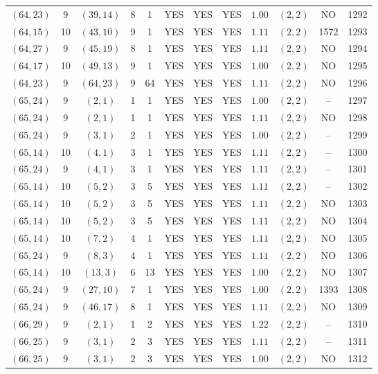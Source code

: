 \begin{longtable}{|c|c|c|c|c|c|c|c|c|c|c|c|}
$(64,23)$ & 9 & $(39,14)$ & 8 & 1 & YES & YES & YES & $1.00$ & $(2,2)$ & NO & 1292\\
$(64,15)$ & 10 & $(43,10)$ & 9 & 1 & YES & YES & YES & $1.11$ & $(2,2)$ & 1572 & 1293\\
$(64,27)$ & 9 & $(45,19)$ & 8 & 1 & YES & YES & YES & $1.11$ & $(2,2)$ & NO & 1294\\
$(64,17)$ & 10 & $(49,13)$ & 9 & 1 & YES & YES & YES & $1.00$ & $(2,2)$ & NO & 1295\\
$(64,23)$ & 9 & $(64,23)$ & 9 & 64 & YES & YES & YES & $1.11$ & $(2,2)$ & NO & 1296\\
$(65,24)$ & 9 & $(2,1)$ & 1 & 1 & YES & YES & YES & $1.00$ & $(2,2)$ & -- & 1297\\
$(65,24)$ & 9 & $(2,1)$ & 1 & 1 & YES & YES & YES & $1.11$ & $(2,2)$ & NO & 1298\\
$(65,24)$ & 9 & $(3,1)$ & 2 & 1 & YES & YES & YES & $1.00$ & $(2,2)$ & -- & 1299\\
$(65,14)$ & 10 & $(4,1)$ & 3 & 1 & YES & YES & YES & $1.11$ & $(2,2)$ & -- & 1300\\
$(65,24)$ & 9 & $(4,1)$ & 3 & 1 & YES & YES & YES & $1.11$ & $(2,2)$ & -- & 1301\\
$(65,14)$ & 10 & $(5,2)$ & 3 & 5 & YES & YES & YES & $1.11$ & $(2,2)$ & -- & 1302\\
$(65,14)$ & 10 & $(5,2)$ & 3 & 5 & YES & YES & YES & $1.11$ & $(2,2)$ & NO & 1303\\
$(65,14)$ & 10 & $(5,2)$ & 3 & 5 & YES & YES & YES & $1.11$ & $(2,2)$ & NO & 1304\\
$(65,14)$ & 10 & $(7,2)$ & 4 & 1 & YES & YES & YES & $1.11$ & $(2,2)$ & NO & 1305\\
$(65,24)$ & 9 & $(8,3)$ & 4 & 1 & YES & YES & YES & $1.11$ & $(2,2)$ & NO & 1306\\
$(65,14)$ & 10 & $(13,3)$ & 6 & 13 & YES & YES & YES & $1.00$ & $(2,2)$ & NO & 1307\\
$(65,24)$ & 9 & $(27,10)$ & 7 & 1 & YES & YES & YES & $1.00$ & $(2,2)$ & 1393 & 1308\\
$(65,24)$ & 9 & $(46,17)$ & 8 & 1 & YES & YES & YES & $1.11$ & $(2,2)$ & NO & 1309\\
$(66,29)$ & 9 & $(2,1)$ & 1 & 2 & YES & YES & YES & $1.22$ & $(2,2)$ & -- & 1310\\
$(66,25)$ & 9 & $(3,1)$ & 2 & 3 & YES & YES & YES & $1.11$ & $(2,2)$ & -- & 1311\\
$(66,25)$ & 9 & $(3,1)$ & 2 & 3 & YES & YES & YES & $1.00$ & $(2,2)$ & NO & 1312\\

\end{longtable}
